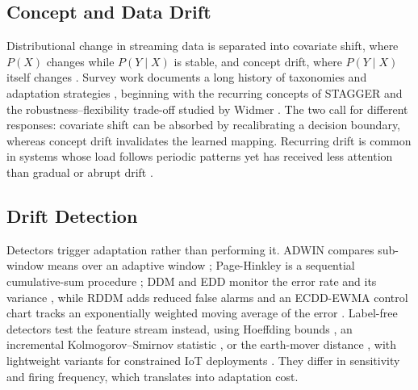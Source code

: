 \documentclass[conference]{IEEEtran}
\begin{document}
\subsection{Concept and Data Drift}
Distributional change in streaming data is separated into covariate shift, where
$P(X)$ changes while $P(Y\mid X)$ is stable, and concept drift, where $P(Y\mid X)$
itself changes \cite{gama2014survey,lu2018learning}. Survey work documents a long
history of taxonomies and adaptation strategies \cite{khamassi2018discussion},
beginning with the recurring concepts of STAGGER \cite{schlimmer1986incremental} and
the robustness--flexibility trade-off studied by Widmer \cite{widmer1994combining}.
The two call for different responses: covariate shift can be absorbed by
recalibrating a decision boundary, whereas concept drift invalidates the learned
mapping. Recurring drift is common in systems whose load follows periodic patterns
yet has received less attention than gradual or abrupt drift \cite{gomes2017adaptive}.

\subsection{Drift Detection}
Detectors trigger adaptation rather than performing it. ADWIN compares sub-window
means over an adaptive window \cite{bifet2007learning}; Page-Hinkley is a sequential
cumulative-sum procedure \cite{page1954continuous}; DDM and EDD monitor the error rate
and its variance \cite{gama2004learning,baena2006early}, while RDDM adds reduced false
alarms \cite{barros2017rddm} and an ECDD-EWMA control chart tracks an exponentially
weighted moving average of the error \cite{ross2012exponentially}. Label-free detectors test the feature stream instead,
using Hoeffding bounds \cite{frias2014online}, an incremental Kolmogorov--Smirnov
statistic \cite{dos2016fast}, or the earth-mover distance \cite{brockhoff2020time},
with lightweight variants for constrained IoT deployments \cite{9427288}. They
differ in sensitivity and firing frequency, which translates into adaptation cost.
\end{document}
